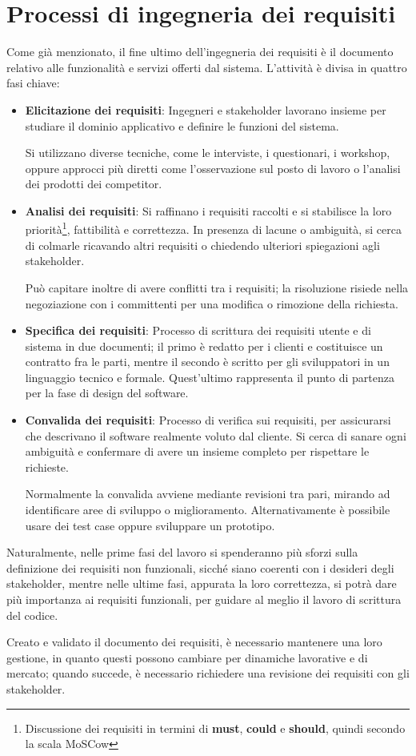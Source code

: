 \section{Processi di ingegneria dei requisiti}
Come già menzionato, il fine ultimo dell'ingegneria dei requisiti è il documento relativo alle funzionalità e servizi offerti dal sistema. L'attività è
divisa in quattro fasi chiave: \begin{itemize}
	\item \textbf{Elicitazione dei requisiti}: Ingegneri e stakeholder lavorano insieme per studiare il dominio applicativo e definire le funzioni del
	sistema.\par
	Si utilizzano diverse tecniche, come le interviste, i questionari, i workshop, oppure approcci più diretti come l'osservazione sul posto di lavoro
	o l'analisi dei prodotti dei competitor.
	\item \textbf{Analisi dei requisiti}: Si raffinano i requisiti raccolti e si stabilisce la loro priorità\footnote{Discussione dei requisiti in
	termini di \textbf{must}, \textbf{could} e \textbf{should}, quindi secondo la scala MoSCow}, fattibilità e correttezza. In presenza di lacune o
	ambiguità, si cerca di colmarle ricavando altri requisiti o chiedendo ulteriori spiegazioni agli stakeholder.\par
	Può capitare inoltre di avere conflitti tra i requisiti; la risoluzione risiede nella negoziazione con i committenti per una modifica o rimozione
	della richiesta.
	\item \textbf{Specifica dei requisiti}: Processo di scrittura dei requisiti utente e di sistema in due documenti; il primo è redatto per i clienti
	e costituisce un contratto fra le parti, mentre il secondo è scritto per gli sviluppatori in un linguaggio tecnico e formale. Quest'ultimo
	rappresenta il punto di partenza per la fase di design del software.
	\item \textbf{Convalida dei requisiti}: Processo di verifica sui requisiti, per assicurarsi che descrivano il software realmente voluto dal cliente.
	Si cerca di sanare ogni ambiguità e confermare di avere un insieme completo per rispettare le richieste.\par
	Normalmente la convalida avviene mediante revisioni tra pari, mirando ad identificare aree di sviluppo o miglioramento. Alternativamente è possibile
	usare dei test case oppure sviluppare un prototipo.
\end{itemize}
\noindent Naturalmente, nelle prime fasi del lavoro si spenderanno più sforzi sulla definizione dei requisiti non funzionali, sicché siano coerenti con
i desideri degli stakeholder, mentre nelle ultime fasi, appurata la loro correttezza, si potrà dare più importanza ai requisiti funzionali, per guidare
al meglio il lavoro di scrittura del codice.\par
Creato e validato il documento dei requisiti, è necessario mantenere una loro gestione, in quanto questi possono cambiare per dinamiche lavorative e di
mercato; quando succede, è necessario richiedere una revisione dei requisiti con gli stakeholder.

